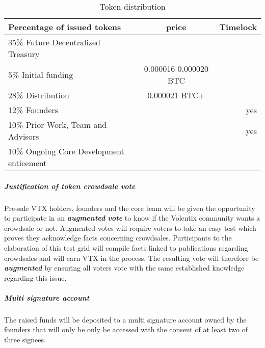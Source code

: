 \documentclass[]{article}
\begin{document}
\begin{table}[h!]
	\begin{center}
		\caption{Token distribution}
		\label{tab:table1}
		\begin{tabular}{l|c|r}
			\textbf{Percentage of issued tokens} & \textbf{price} & \textbf{Timelock} \\
		
			\hline
			35\% Future Decentralized Treasury & & \\
			\hline
			5\%  Initial funding & 0.000016-0.000020 BTC & \\
			\hline
			28\% Distribution & 0.000021 BTC+ & \\
			\hline
			12\% Founders &  & yes \\
			\hline
			10\% Prior Work, Team and Advisors & & yes\\
		
			\hline
			10\% Ongoing Core Development enticement & &\\
			\hline		
			
				
		\end{tabular}
	\end{center}


\end{table}

\subparagraph{Justification of token crowdsale vote}
Pre-sale VTX holders, founders and the core team will be given the opportunity to participate in an \textbf{\textit{augmented} \textit{vote}}\cite{21} to know if the Volentix community wants a crowdsale or not. Augmented votes will require voters to take an easy test which proves they acknowledge facts concerning crowdsales. Participants to the elaboration of this test grid will compile facts linked to publications regarding crowdsales and will earn VTX in the process. The resulting vote will therefore be \textit{\textbf{augmented}} by ensuring all voters vote with the same established knowledge regarding this issue.  

\subparagraph{Multi signature account}
The raised funds will be deposited to a multi signature account owned by the founders that will only be only be accessed with the consent of at least two of three signees.
\end{document}
